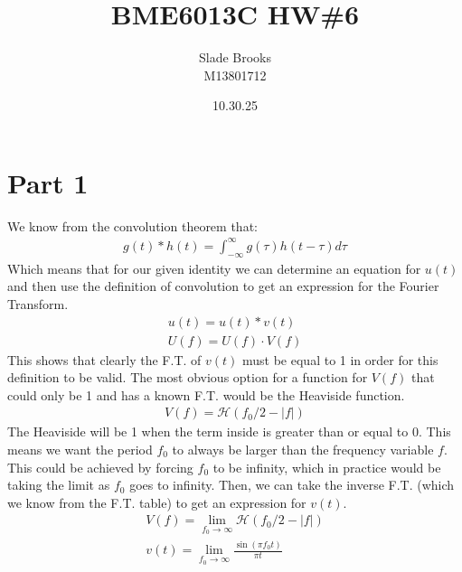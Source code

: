 \documentclass[12 pt]{article}
\title{BME6013C HW\#6}
\date{10.30.25}
\author{Slade Brooks \\ M13801712}
\begin{document}
\maketitle

\section*{Part 1}
We know from the convolution theorem that:
\begin{align*}
    g(t)*h(t)=\int_{-\infty}^{\infty}g(\tau)h(t-\tau)d\tau
\end{align*}
Which means that for our given identity we can determine an equation for $u(t)$ and then use the definition of
convolution to get an expression for the Fourier Transform.
\begin{align*}
    u(t)=u(t)*v(t) \\
    U(f) = U(f)\cdot V(f)
\end{align*}
This shows that clearly the F.T. of $v(t)$ must be equal to 1 in order for this definition to be valid. The most obvious
option for a function for $V(f)$ that could only be 1 and has a known F.T. would be the Heaviside function.
\begin{align*}
    V(f) = \mathcal{H}(f_0/2 - |f|)
\end{align*}
The Heaviside will be 1 when the term inside is greater than or equal to 0. This means we want the period $f_0$ to
always be larger than the frequency variable $f$. This could be achieved by forcing $f_0$ to be infinity, which in
practice would be taking the limit as $f_0$ goes to infinity. Then, we can take the inverse F.T. (which we know from the
F.T. table) to get an expression for $v(t)$.
\begin{align*}
    V(f) = \lim_{f_0\rightarrow\infty}\mathcal{H}(f_0/2-|f|) \\
    v(t) = \lim_{f_0\rightarrow\infty}\frac{\sin{(\pi f_0 t)}}{\pi t}
\end{align*}
\end{document}
